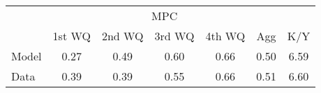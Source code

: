 \begin{tabular}{@{}lcccccc@{}} 
\toprule 
                  & \multicolumn{5}{c}{MPC} &   \\   
                  &  1st WQ  & 2nd WQ  & 3rd WQ & 4th WQ  & Agg  &  K/Y  \\  \midrule 
Model &0.27 & 0.49 & 0.60 & 0.66 & 0.50 & 6.59 \\ 
Data &0.39 & 0.39 & 0.55 & 0.66 & 0.51 & 6.60 \\ \bottomrule
\end{tabular}  
